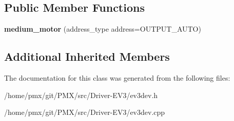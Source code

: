 \subsection*{Public Member Functions}
\begin{DoxyCompactItemize}
\item 
\mbox{\label{classev3dev_1_1medium__motor_abb4182a5696726c9a2c2232966a4583f}} 
{\bfseries medium\+\_\+motor} (address\+\_\+type address=O\+U\+T\+P\+U\+T\+\_\+\+A\+U\+TO)
\end{DoxyCompactItemize}
\subsection*{Additional Inherited Members}


The documentation for this class was generated from the following files\+:\begin{DoxyCompactItemize}
\item 
/home/pmx/git/\+P\+M\+X/src/\+Driver-\/\+E\+V3/ev3dev.\+h\item 
/home/pmx/git/\+P\+M\+X/src/\+Driver-\/\+E\+V3/ev3dev.\+cpp\end{DoxyCompactItemize}
